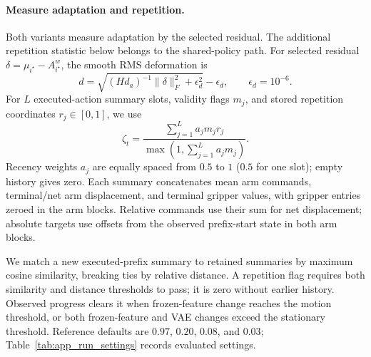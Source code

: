 \paragraph{Measure adaptation and repetition.}
Both variants measure adaptation by the selected residual. The additional repetition statistic below belongs to the shared-policy path.
For selected residual $\delta=\mu_{i^\star}-A_{i^\star}^w$, the smooth RMS deformation is
\[
 d=\sqrt{(Hd_a)^{-1}\|\delta\|_F^2+\epsilon_d^2}-\epsilon_d,
 \qquad \epsilon_d=10^{-6}.
\]
For $L$ executed-action summary slots, validity flags $m_j$, and stored repetition coordinates $r_j\in[0,1]$, we use
\[
 \zeta_t=\frac{\sum_{j=1}^La_jm_jr_j}{\max(1,\sum_{j=1}^La_jm_j)}.
\]
Recency weights $a_j$ are equally spaced from $0.5$ to $1$ ($0.5$ for one slot); empty history gives zero.
Each summary concatenates mean arm commands, terminal/net arm displacement, and terminal gripper values, with gripper entries zeroed in the arm blocks.
Relative commands use their sum for net displacement; absolute targets use offsets from the observed prefix-start state in both arm blocks.

We match a new executed-prefix summary to retained summaries by maximum cosine similarity, breaking ties by relative distance.
A repetition flag requires both similarity and distance thresholds to pass; it is zero without earlier history.
Observed progress clears it when frozen-feature change reaches the motion threshold, or both frozen-feature and VAE changes exceed the stationary threshold.
Reference defaults are $0.97$, $0.20$, $0.08$, and $0.03$; Table~\ref{tab:app_run_settings} records evaluated settings.

